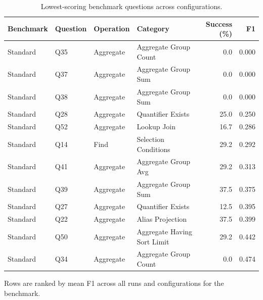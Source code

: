 \begin{table}[htbp]
\centering
\small
\caption{Lowest-scoring benchmark questions across configurations.}
\label{tab:lowest-scoring-questions}
\begin{tabular}{llllrr}
\toprule
Benchmark & Question & Operation & Category & Success (\%) & F1 \\
\midrule
Standard & Q35 & Aggregate & Aggregate Group Count & 0.0 & 0.000 \\
Standard & Q37 & Aggregate & Aggregate Group Sum & 0.0 & 0.000 \\
Standard & Q38 & Aggregate & Aggregate Group Sum & 0.0 & 0.000 \\
Standard & Q28 & Aggregate & Quantifier Exists & 25.0 & 0.250 \\
Standard & Q52 & Aggregate & Lookup Join & 16.7 & 0.286 \\
Standard & Q14 & Find & Selection Conditions & 29.2 & 0.292 \\
Standard & Q41 & Aggregate & Aggregate Group Avg & 29.2 & 0.313 \\
Standard & Q39 & Aggregate & Aggregate Group Sum & 37.5 & 0.375 \\
Standard & Q27 & Aggregate & Quantifier Exists & 12.5 & 0.395 \\
Standard & Q22 & Aggregate & Alias Projection & 37.5 & 0.399 \\
Standard & Q50 & Aggregate & Aggregate Having Sort Limit & 29.2 & 0.442 \\
Standard & Q34 & Aggregate & Aggregate Group Count & 0.0 & 0.474 \\
\bottomrule
\end{tabular}
\par\footnotesize{Rows are ranked by mean F1 across all runs and configurations for the benchmark.}
\end{table}
